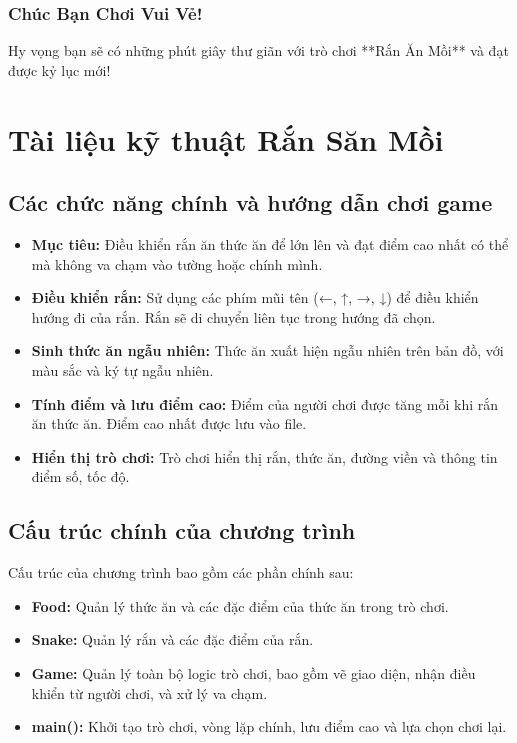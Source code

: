 \documentclass[a4paper,12pt]{article}
\begin{document}
\subsubsection*{Chúc Bạn Chơi Vui Vẻ!}
Hy vọng bạn sẽ có những phút giây thư giãn với trò chơi **Rắn Ăn Mồi** và đạt được kỷ lục mới!


\newpage
\section{Tài liệu kỹ thuật Rắn Săn Mồi}

\subsection{Các chức năng chính và hướng dẫn chơi game}
\begin{itemize}
    \item \textbf{Mục tiêu:} Điều khiển rắn ăn thức ăn để lớn lên và đạt điểm cao nhất có thể mà không va chạm vào tường hoặc chính mình.
    \item \textbf{Điều khiển rắn:} Sử dụng các phím mũi tên (←, ↑, →, ↓) để điều khiển hướng đi của rắn. Rắn sẽ di chuyển liên tục trong hướng đã chọn.
    \item \textbf{Sinh thức ăn ngẫu nhiên:} Thức ăn xuất hiện ngẫu nhiên trên bản đồ, với màu sắc và ký tự ngẫu nhiên.
    \item \textbf{Tính điểm và lưu điểm cao:} Điểm của người chơi được tăng mỗi khi rắn ăn thức ăn. Điểm cao nhất được lưu vào file.
    \item \textbf{Hiển thị trò chơi:} Trò chơi hiển thị rắn, thức ăn, đường viền và thông tin điểm số, tốc độ.
\end{itemize}

\subsection{Cấu trúc chính của chương trình}
Cấu trúc của chương trình bao gồm các phần chính sau:
\begin{itemize}
    \item \textbf{Food:} Quản lý thức ăn và các đặc điểm của thức ăn trong trò chơi.
    \item \textbf{Snake:} Quản lý rắn và các đặc điểm của rắn.
    \item \textbf{Game:} Quản lý toàn bộ logic trò chơi, bao gồm vẽ giao diện, nhận điều khiển từ người chơi, và xử lý va chạm.
    \item \textbf{main():} Khởi tạo trò chơi, vòng lặp chính, lưu điểm cao và lựa chọn chơi lại.
\end{itemize}
\end{document}
